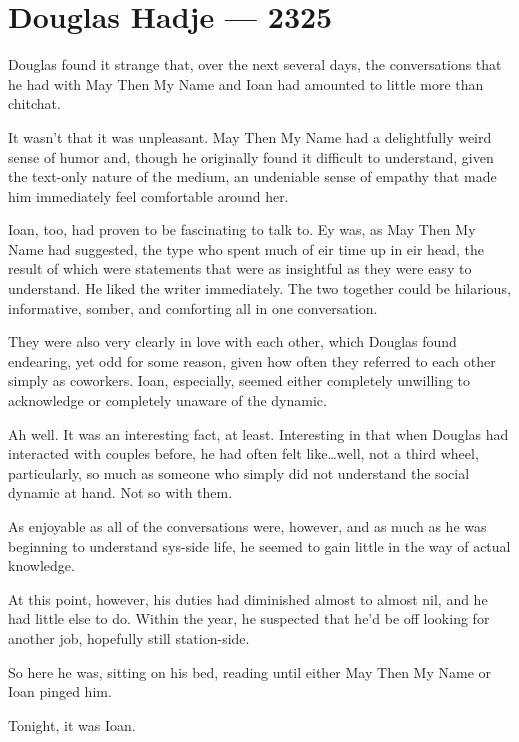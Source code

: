 \hypertarget{douglas-hadje-2325}{%
\chapter{Douglas Hadje — 2325}\label{douglas-hadje-2325}}

Douglas found it strange that, over the next several days, the conversations that he had with May Then My Name and Ioan had amounted to little more than chitchat.

It wasn't that it was unpleasant. May Then My Name had a delightfully weird sense of humor and, though he originally found it difficult to understand, given the text-only nature of the medium, an undeniable sense of empathy that made him immediately feel comfortable around her.

Ioan, too, had proven to be fascinating to talk to. Ey was, as May Then My Name had suggested, the type who spent much of eir time up in eir head, the result of which were statements that were as insightful as they were easy to understand. He liked the writer immediately. The two together could be hilarious, informative, somber, and comforting all in one conversation.

They were also very clearly in love with each other, which Douglas found endearing, yet odd for some reason, given how often they referred to each other simply as coworkers. Ioan, especially, seemed either completely unwilling to acknowledge or completely unaware of the dynamic.

Ah well. It was an interesting fact, at least. Interesting in that when Douglas had interacted with couples before, he had often felt like\ldots well, not a third wheel, particularly, so much as someone who simply did not understand the social dynamic at hand. Not so with them.

As enjoyable as all of the conversations were, however, and as much as he was beginning to understand sys-side life, he seemed to gain little in the way of actual knowledge.

At this point, however, his duties had diminished almost to almost nil, and he had little else to do. Within the year, he suspected that he'd be off looking for another job, hopefully still station-side.

So here he was, sitting on his bed, reading until either May Then My Name or Ioan pinged him.

Tonight, it was Ioan.


